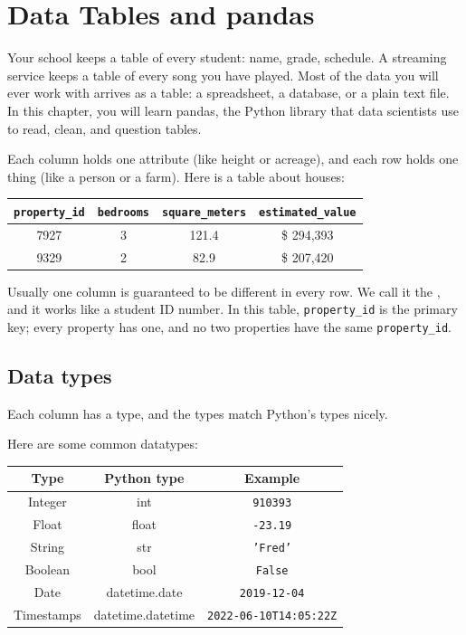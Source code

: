 \chapter{Data Tables and pandas}
Your school keeps a table of every student: name, grade, schedule. A
streaming service keeps a table of every song you have played. Most of the
data you will ever work with arrives as a table: a spreadsheet, a database,
or a plain text file. In this chapter, you will learn pandas, the Python
library that data scientists use to read, clean, and question tables.

Each column holds one attribute (like height or acreage), and each row
holds one thing (like a person or a farm). Here is a table about houses:

\begin{tabular}{c | c | c | c}
  \texttt{property\_id} & \texttt{bedrooms} & \texttt{square\_meters} & \texttt{estimated\_value} \\
  \hline
  7927 &  3 & 121.4 & \$ 294,393 \\
  9329 &  2 & 82.9 & \$ 207,420 \\
\end{tabular}

Usually one column is guaranteed to be different in every row. We call it
the , and it works like a student
ID number.  In this table, \texttt{property\_id} is
the primary key; every property has one, and no two properties have
the same \texttt{property\_id}.

\section{Data types}

Each column has a type, and the types match Python's types nicely.

Here are some common datatypes:
\begin{tabular}{c | c | c }
  Type & Python type & Example \\
  \hline
  Integer & int & \texttt{910393} \\
  Float & float & \texttt{-23.19} \\
  String & str & \texttt{'Fred'} \\
  Boolean & bool & \texttt{False} \\
  Date & datetime.date & \texttt{2019-12-04} \\
  Timestamps & datetime.datetime & \texttt{2022-06-10T14:05:22Z} \\
\end{tabular}

